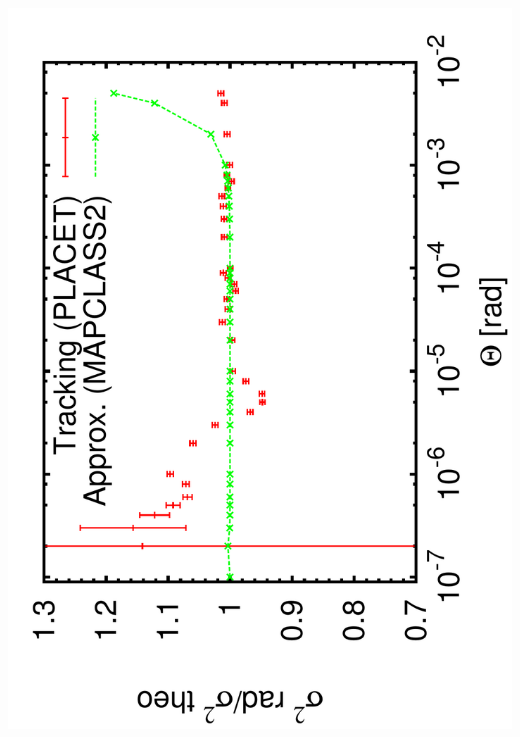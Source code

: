 \documentclass{beamer}
\begin{document}
\begin{frame}
 \includegraphics[scale=0.24,angle=-90]{sigma_angle_r6_twiss.pdf} \par

\end{frame}
\end{document}
